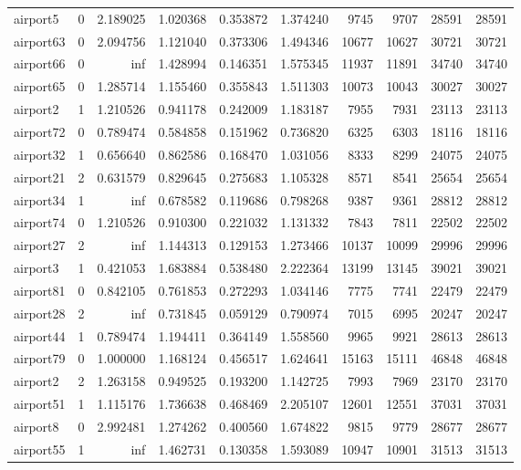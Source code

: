 \begin{longtable}{|l|r|r|r|r|r|r|r|r|r|}
airport5 & 0 & 2.189025 & 1.020368 & 0.353872 & 1.374240 & 9745 & 9707 & 28591 & 28591 \\
airport63 & 0 & 2.094756 & 1.121040 & 0.373306 & 1.494346 & 10677 & 10627 & 30721 & 30721 \\
airport66 & 0 & inf & 1.428994 & 0.146351 & 1.575345 & 11937 & 11891 & 34740 & 34740 \\
airport65 & 0 & 1.285714 & 1.155460 & 0.355843 & 1.511303 & 10073 & 10043 & 30027 & 30027 \\
airport2 & 1 & 1.210526 & 0.941178 & 0.242009 & 1.183187 & 7955 & 7931 & 23113 & 23113 \\
airport72 & 0 & 0.789474 & 0.584858 & 0.151962 & 0.736820 & 6325 & 6303 & 18116 & 18116 \\
airport32 & 1 & 0.656640 & 0.862586 & 0.168470 & 1.031056 & 8333 & 8299 & 24075 & 24075 \\
airport21 & 2 & 0.631579 & 0.829645 & 0.275683 & 1.105328 & 8571 & 8541 & 25654 & 25654 \\
airport34 & 1 & inf & 0.678582 & 0.119686 & 0.798268 & 9387 & 9361 & 28812 & 28812 \\
airport74 & 0 & 1.210526 & 0.910300 & 0.221032 & 1.131332 & 7843 & 7811 & 22502 & 22502 \\
airport27 & 2 & inf & 1.144313 & 0.129153 & 1.273466 & 10137 & 10099 & 29996 & 29996 \\
airport3 & 1 & 0.421053 & 1.683884 & 0.538480 & 2.222364 & 13199 & 13145 & 39021 & 39021 \\
airport81 & 0 & 0.842105 & 0.761853 & 0.272293 & 1.034146 & 7775 & 7741 & 22479 & 22479 \\
airport28 & 2 & inf & 0.731845 & 0.059129 & 0.790974 & 7015 & 6995 & 20247 & 20247 \\
airport44 & 1 & 0.789474 & 1.194411 & 0.364149 & 1.558560 & 9965 & 9921 & 28613 & 28613 \\
airport79 & 0 & 1.000000 & 1.168124 & 0.456517 & 1.624641 & 15163 & 15111 & 46848 & 46848 \\
airport2 & 2 & 1.263158 & 0.949525 & 0.193200 & 1.142725 & 7993 & 7969 & 23170 & 23170 \\
airport51 & 1 & 1.115176 & 1.736638 & 0.468469 & 2.205107 & 12601 & 12551 & 37031 & 37031 \\
airport8 & 0 & 2.992481 & 1.274262 & 0.400560 & 1.674822 & 9815 & 9779 & 28677 & 28677 \\
airport55 & 1 & inf & 1.462731 & 0.130358 & 1.593089 & 10947 & 10901 & 31513 & 31513 \\

\end{longtable}
